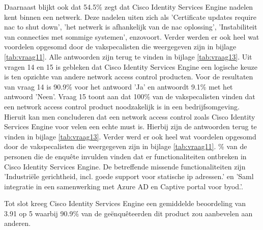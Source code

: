 Daarnaast blijkt ook dat 54.5\% zegt dat Cisco Identity Services Engine nadelen kent binnen een netwerk. Deze nadelen uiten zich als 'Certificate updates require nac to shut down', 'het netwerk is afhankelijk van de nac oplossing', 'Instabiliteit van connecties met sommige systemen', enzovoort. Verder werden er ook heel wat voordelen opgesomd door de vakspecalisten die weergegeven zijn in bijlage \ref{tab:vraag11}. Alle antwoorden zijn terug te vinden in bijlage \ref{tab:vraag13}.
\newline
\newline
Uit vragen 14 en 15 is gebleken dat Cisco Identity Services Engine een logische keuze is ten opzichte van andere network access control producten. Voor de resultaten van vraag 14 is 90.9\% voor het antwoord 'Ja' en antwoordt 9.1\% met het antwoord 'Neen'. Vraag 15 toont aan dat 100\% van de vakspecalisten vinden dat een network access control product noodzakelijk is in een bedrijfsomgeving. Hieruit kan men concluderen dat een network access control zoals Cisco Identity Services Engine voor velen een echte must is.
Hierbij zijn de antwoorden terug te vinden in bijlage \ref{tab:vraag13}. Verder werd er ook heel wat voordelen opgesomd door de vakspecalisten die weergegeven zijn in bijlage \ref{tab:vraag11}.
\newline
{}\% van de personen die de enquête invulden vinden dat er functionaliteiten ontbreken in Cisco Identity Services Engine. De betreffende missende functionaliteiten zijn 'Industriële gerichtheid, incl. goede support voor statische ip adressen.' en 'Saml integratie in een samenwerking met Azure AD en Captive portal voor byod.’.


Tot slot kreeg Cisco Identity Services Engine een gemiddelde beoordeling van 3.91 op 5 waarbij 90.9\% van de geënquêteerden dit product zou aanbevelen aan anderen.



